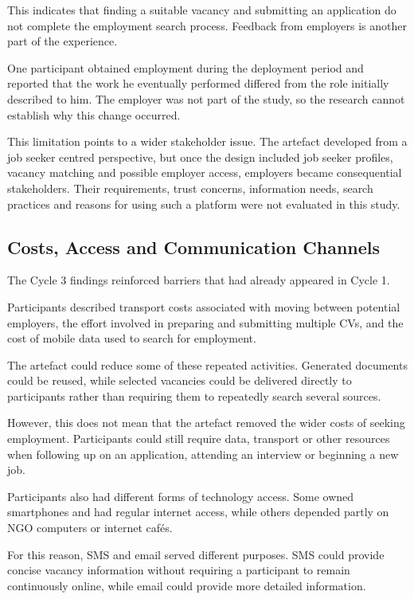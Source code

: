 This indicates that finding a suitable vacancy and submitting an application do not complete the employment search process. Feedback from employers is another part of the experience.

One participant obtained employment during the deployment period and reported that the work he eventually performed differed from the role initially described to him. The employer was not part of the study, so the research cannot establish why this change occurred.

This limitation points to a wider stakeholder issue. The artefact developed from a job seeker centred perspective, but once the design included job seeker profiles, vacancy matching and possible employer access, employers became consequential stakeholders. Their requirements, trust concerns, information needs, search practices and reasons for using such a platform were not evaluated in this study.


\subsection{Costs, Access and Communication Channels}

The Cycle 3 findings reinforced barriers that had already appeared in Cycle 1.

Participants described transport costs associated with moving between potential employers, the effort involved in preparing and submitting multiple CVs, and the cost of mobile data used to search for employment.

The artefact could reduce some of these repeated activities. Generated documents could be reused, while selected vacancies could be delivered directly to participants rather than requiring them to repeatedly search several sources.

However, this does not mean that the artefact removed the wider costs of seeking employment. Participants could still require data, transport or other resources when following up on an application, attending an interview or beginning a new job.

Participants also had different forms of technology access. Some owned smartphones and had regular internet access, while others depended partly on NGO computers or internet cafés.

For this reason, SMS and email served different purposes. SMS could provide concise vacancy information without requiring a participant to remain continuously online, while email could provide more detailed information.

